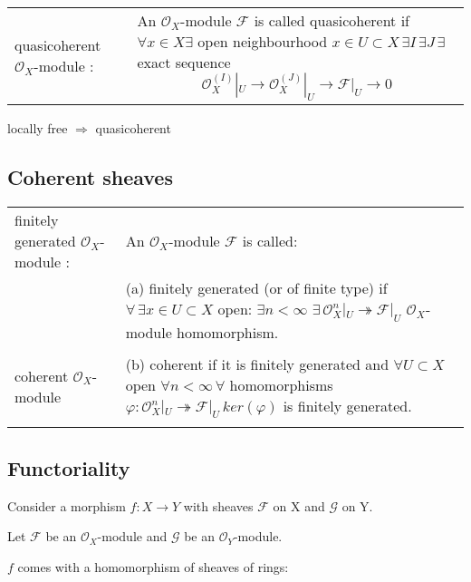 \documentclass[a4paper, 12pt]{article}
\newcommand{\ca}[1]{\mathcal{#1}}
\newcommand{\caf}{\mathcal{F}}
\newcommand{\cag}{\mathcal{G}}
\newcommand{\oxmod}{$\mathcal{O}_X$-module }
\newcommand{\ox}{\mathcal{O}_X}
\begin{document}
\begin{tabular}{p{4cm} p{12cm}}


quasicoherent \oxmod: & An \oxmod $\caf$ is called quasicoherent if $\forall x\in X \exists$ open neighbourhood $x\in U \subset X\,  \exists I\, \exists J\, \exists $ exact sequence
  \[
\ox^{(I)}|_U \longrightarrow \ox^{(J)}|_U \longrightarrow \caf|_U \longrightarrow 0
\]
\\
\end{tabular}


locally free $\Longrightarrow$ quasicoherent





\subsection{Coherent sheaves}

\begin{tabular}{p{4cm} p{12cm}}



finitely generated \oxmod : & An \oxmod $\caf$ is called: \\
  & (a) finitely generated (or of finite type) if $\forall\,\exists x\in U \subset X $
  open:
  $\exists n < \infty$ $\exists \, \ox^n|_U \twoheadrightarrow \caf|_U$  \oxmod  homomorphism.
\\

&\\

coherent \oxmod &(b) coherent if it is finitely generated and $\forall U \subset X $ open $\forall n < \infty \, \forall$
homomorphisms $\varphi : \ox^n|_U \twoheadrightarrow \caf|_U \, ker(\varphi)$ is
finitely generated. \\

&\\
\end{tabular}


%
%

  
  



\subsection{Functoriality}

Consider a morphism $f:X\longrightarrow Y$ with sheaves $\caf$ on X and $\cag$ on Y.

Let $\caf$ be an \oxmod and $\cag$ be an $\ca{O}_Y$-module.

$f$ comes with a homomorphism of sheaves of rings:
\end{document}
